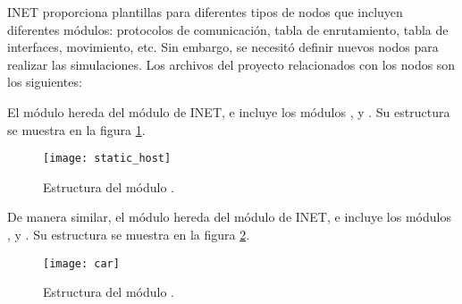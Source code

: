 \label{subsubsec:nodos_de_la_red_sim}

INET proporciona plantillas para diferentes tipos de nodos que incluyen
diferentes módulos: protocolos de comunicación, tabla de enrutamiento, tabla de
interfaces, movimiento, etc. Sin embargo, se necesitó definir nuevos nodos para
realizar las simulaciones. Los archivos del proyecto relacionados con los nodos
son los siguientes:


El módulo  hereda del módulo  de INET, e
incluye los módulos ,  y
. Su estructura se muestra en la figura
\ref{fig:static_host}.

\begin{figure}[th!]
\centering
\texttt{[image: static\_host]}
\decoRule
\caption[Estructura del módulo ]{Estructura del módulo
.}
\label{fig:static_host}
\end{figure}

De manera similar, el módulo  hereda del módulo  de
INET, e incluye los módulos ,  y
. Su estructura se muestra en la figura \ref{fig:car}.

\begin{figure}[th!]
\centering
\texttt{[image: car]}
\decoRule
\caption[Estructura del módulo ]{Estructura del módulo .}
\label{fig:car}
\end{figure}
